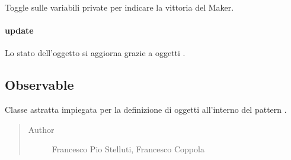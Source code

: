 \documentclass[letterpaper,10pt,italian,openany,oneside]{sphinxmanual}
\begin{document}
\begin{fulllineitems}
\label{\detokenize{test/it/unicam/cs/pa/mastermind/gamecore/MatchState:it.unicam.cs.pa.mastermind.gamecore.MatchState.toggleMakerWin()}}
Toggle sulle variabili private per indicare la vittoria del Maker.

\end{fulllineitems}



\paragraph{update}
\label{\detokenize{test/it/unicam/cs/pa/mastermind/gamecore/MatchState:update}}

\begin{fulllineitems}
\label{\detokenize{test/it/unicam/cs/pa/mastermind/gamecore/MatchState:it.unicam.cs.pa.mastermind.gamecore.MatchState.update(Observable)}}
Lo stato dell’oggetto si aggiorna grazie a oggetti .

\end{fulllineitems}



\subsection{Observable}
\label{\detokenize{test/it/unicam/cs/pa/mastermind/gamecore/Observable:observable}}\label{\detokenize{test/it/unicam/cs/pa/mastermind/gamecore/Observable::doc}}

\begin{fulllineitems}
\label{\detokenize{test/it/unicam/cs/pa/mastermind/gamecore/Observable:it.unicam.cs.pa.mastermind.gamecore.Observable}}
Classe astratta impiegata per la definizione di oggetti  all’interno del pattern .
\begin{quote}\begin{description}
\item[{Author}] \leavevmode
Francesco Pio Stelluti, Francesco Coppola

\end{description}\end{quote}

\end{fulllineitems}
\end{document}
